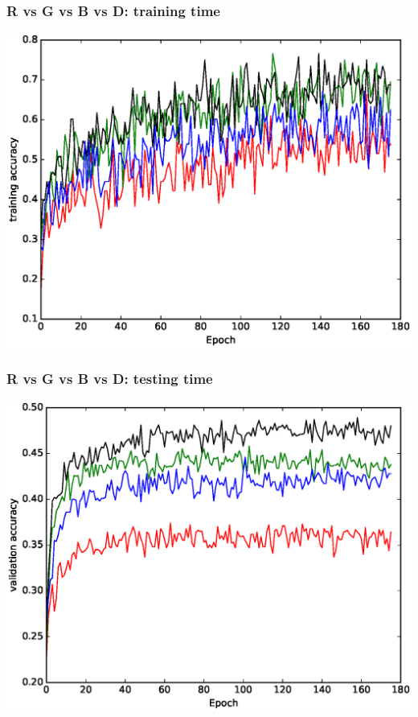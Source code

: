 \documentclass{beamer}
\begin{document}
\begin{frame}
\frametitle{R vs G vs B vs D: training time}
\includegraphics[width=\linewidth]{train.eps}
\end{frame}


\begin{frame}
\frametitle{R vs G vs B vs D: testing time}
\includegraphics[width=\linewidth]{test.eps}
\end{frame}
\end{document}
